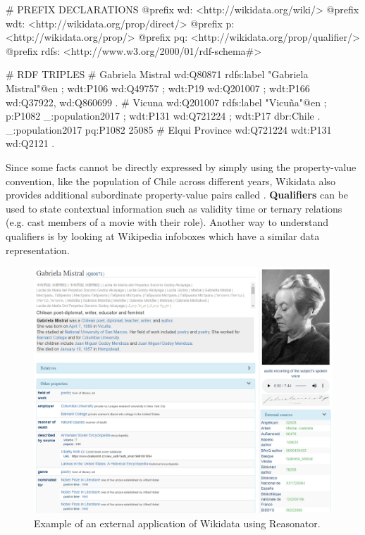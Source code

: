 \begin{sparqlcode}[%
    caption=Set of RDF triples about Gabriela Mistral in Wikidata., 
    label=lst:wikidataRdfExample]
# PREFIX DECLARATIONS
@prefix wd: <http://wikidata.org/wiki/>
@prefix wdt: <http://wikidata.org/prop/direct/>
@prefix p: <http://wikidata.org/prop/>
@prefix pq: <http://wikidata.org/prop/qualifier/>
@prefix rdfs: <http://www.w3.org/2000/01/rdf-schema#>

# RDF TRIPLES
# Gabriela Mistral
wd:Q80871 rdfs:label "Gabriela Mistral"@en ;
    wdt:P106 wd:Q49757 ;
    wdt:P19 wd:Q201007 ;
    wdt:P166 wd:Q37922, wd:Q860699 .
# Vicuna
wd:Q201007 rdfs:label "Vicuña"@en ;
    p:P1082 _:population2017 ;
    wdt:P131 wd:Q721224 ;
    wdt:P17 dbr:Chile .
_:population2017 pq:P1082 25085
# Elqui Province
wd:Q721224 wdt:P131 wd:Q2121 .
\end{sparqlcode}

Since some facts cannot be directly expressed by simply using the property-value convention, 
like the population of Chile across different years, Wikidata also provides additional 
subordinate property-value pairs called . \textbf{Qualifiers} can be used 
to state contextual information such as validity time or ternary relations (e.g. cast members of 
a movie with their role). Another way to understand qualifiers is by looking at Wikipedia 
infoboxes which have a similar data representation.

\begin{figure}[!h]
    \centering
    \includegraphics[scale=.5]{imagenes/2_theorical_framework/wikidataReasonatorExample.PNG}
    \caption[Example of an external application of Wikidata using Reasonator.]{Example of an external application of Wikidata using Reasonator\footnotemark.}
    \label{fig:wikidataReasonator}
\end{figure}

